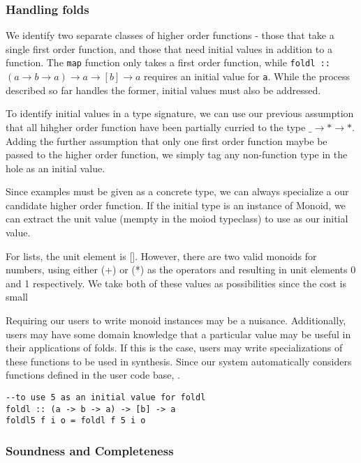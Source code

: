 \subsubsection{Handling folds}
We identify two separate classes of higher order functions - those that take a single first order function, and those that need initial values in addition to a function. The \texttt{map} function only takes a first order function, while \texttt{foldl :: $(a\to b\to a)\to a\to [b]\to a$} requires an initial value for \texttt{a}. While the process described so far handles the former, initial values must also be addressed.

To identify initial values in a type signature, we can use our previous assumption that all hihgher order function have been partially curried to the type \texttt{$\_\to *\to*$}. Adding the further assumption that only one first order function maybe be passed to the higher order function, we simply tag any non-function type in the hole as an initial value. 

Since examples must be given as a concrete type, we can always specialize a our candidate higher order function. If the initial type is an instance of Monoid, we can extract the unit value (mempty in the moiod typeclass) to use as our initial value. 

For lists, the unit element is []. However, there are two valid monoids for numbers, using either (+) or (*) as the operators and resulting in unit elements 0 and 1 respectively. We take both of these values as possibilities since the cost is small 

Requiring our users to write monoid instances may be a nuisance. Additionally, users may have some domain knowledge that a particular value may be useful in their applications of folds. If this is the case, users may write specializations of these functions to be used in synthesis. Since our system automatically considers functions defined in the user code base, .

\begin{lstlisting}
--to use 5 as an initial value for foldl
foldl :: (a -> b -> a) -> [b] -> a
foldl5 f i o = foldl f 5 i o
\end{lstlisting}


\subsubsection{Soundness and Completeness}\label{sound}


